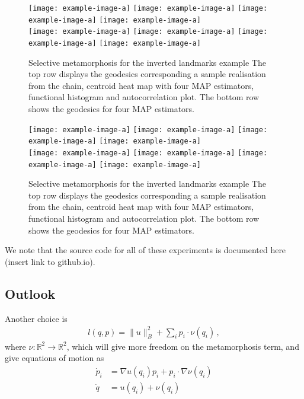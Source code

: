\documentclass{article}
\begin{document}
\begin{figure}
\centering
\begin{minipage}{\textwidth}
  \centering
    \texttt{[image: example-image-a]}\quad
    \texttt{[image: example-image-a]}\quad
    \texttt{[image: example-image-a]}\quad
    \texttt{[image: example-image-a]}\\[0.25cm]
    \texttt{[image: example-image-a]}\quad
    \texttt{[image: example-image-a]}\quad
    \texttt{[image: example-image-a]}\quad
    \texttt{[image: example-image-a]}
    \caption{Selective metamorphosis for the inverted landmarks example The top
    row displays the geodesics corresponding a sample realisation from the
    chain, centroid heat map with four MAP estimators, functional histogram and
    autocorrelation plot. The bottom row shows the geodesics for four MAP
    estimators.}
    \label{fig:selective:crossing}
\end{minipage}
\end{figure}


\begin{figure}
\centering
\begin{minipage}{\textwidth}
  \centering
    \texttt{[image: example-image-a]}\quad
    \texttt{[image: example-image-a]}\quad
    \texttt{[image: example-image-a]}\quad
    \texttt{[image: example-image-a]}\\[0.25cm]
    \texttt{[image: example-image-a]}\quad
    \texttt{[image: example-image-a]}\quad
    \texttt{[image: example-image-a]}\quad
    \texttt{[image: example-image-a]}
    \caption{Selective metamorphosis for the inverted landmarks example The top
    row displays the geodesics corresponding a sample realisation from the
    chain, centroid heat map with four MAP estimators, functional histogram and
    autocorrelation plot. The bottom row shows the geodesics for four MAP
    estimators.}
    \label{fig:selective:crossing}
\end{minipage}
\end{figure}

We note that the source code for all of these experiments is documented
here (insert link to github.io). 

\subsection{Outlook}\label{sec:outlook}
Another choice is 
\begin{align}
    l(q,p) = \|u\|_B^2 + \sum_i p_i\cdot \nu(q_i) \, , 
\end{align}
where $\nu:\mathbb R^2 \to \mathbb R^2$, which will give more freedom on the metamorphosis term, and give equations of motion as 
\begin{align}
    \dot p_i  &= \nabla u(q_i)p_i  + p_i \cdot \nabla \nu(q_i)\\
    \dot q &= u(q_i) + \nu(q_i) 
\end{align}
\end{document}
